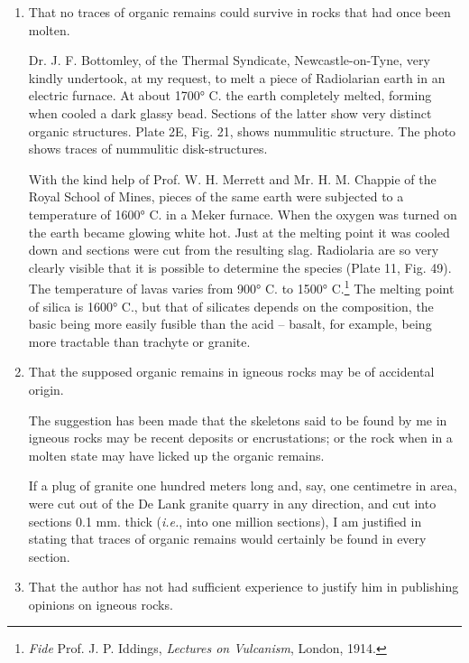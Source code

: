 \documentclass[a4paper, 12pt, oneside]{article}
\begin{document}
\begin{enumerate}
  \item That no traces of organic remains could survive in rocks that had once been molten.

\hspace*{5mm}Dr. J. F. Bottomley, of the Thermal Syndicate, Newcastle-on-Tyne, very kindly undertook, at my request, to melt a piece of Radiolarian earth in an electric furnace. At about 1700° C. the earth completely melted, forming when cooled a dark glassy bead. Sections of the latter show very distinct organic structures. Plate 2E, Fig. 21, shows nummulitic structure. The photo shows traces of nummulitic disk-structures.

\hspace*{5mm}With the kind help of Prof. W. H. Merrett and Mr. H. M. Chappie of the Royal School of Mines, pieces of the same earth were subjected to a temperature of 1600° C. in a Meker furnace. When the oxygen was turned on the earth became glowing white hot. Just at the melting point it was cooled down and sections were cut from the resulting slag. Radiolaria are so very clearly visible that it is possible to determine the species (Plate 11, Fig. 49). The temperature of lavas varies from 900° C. to 1500° C.\footnote{\emph{Fide} Prof. J. P. Iddings, \emph{Lectures on Vulcanism}, London, 1914.} The melting point of silica is 1600° C., but that of silicates depends on the composition, the basic being more easily fusible than the acid -- basalt, for example, being more tractable than trachyte or granite.

  \item That the supposed organic remains in igneous rocks may be of accidental origin.

\hspace*{5mm}The suggestion has been made that the skeletons said to be found by me in igneous rocks may be recent deposits or encrustations; or the rock when in a molten state may have licked up the organic remains.

\hspace*{5mm}If a plug of granite one hundred meters long and, say, one centimetre in area, were cut out of the De Lank granite quarry in any direction, and cut into sections 0.1 mm. thick (\emph{i.e.}, into one million sections), I am justified in stating that traces of organic remains would certainly be found in every section.

  \item That the author has not had sufficient experience to justify him in publishing opinions on igneous rocks.


\end{enumerate}
\end{document}
